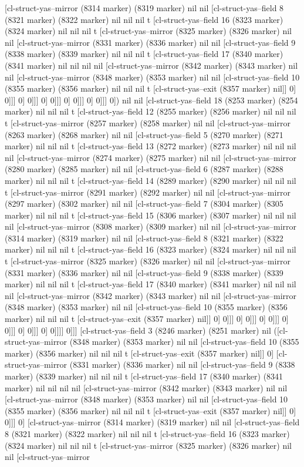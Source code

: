 {{[cl-struct-yas--mirror (8314 marker) (8319 marker) nil nil [cl-struct-yas--field 8 (8321 marker) (8322 marker) nil nil nil t [cl-struct-yas--field 16 (8323 marker) (8324 marker) nil nil nil t [cl-struct-yas--mirror (8325 marker) (8326 marker) nil nil [cl-struct-yas--mirror (8331 marker) (8336 marker) nil nil [cl-struct-yas--field 9 (8338 marker) (8339 marker) nil nil nil t [cl-struct-yas--field 17 (8340 marker) (8341 marker) nil nil nil nil [cl-struct-yas--mirror (8342 marker) (8343 marker) nil nil [cl-struct-yas--mirror (8348 marker) (8353 marker) nil nil [cl-struct-yas--field 10 (8355 marker) (8356 marker) nil nil nil t [cl-struct-yas--exit (8357 marker) nil]] 0] 0]]] 0] 0]]] 0] 0]]] 0] 0]]] 0] 0]]] 0]) nil nil [cl-struct-yas--field 18 (8253 marker) (8254 marker) nil nil nil t [cl-struct-yas--field 12 (8255 marker) (8256 marker) nil nil nil t [cl-struct-yas--mirror (8257 marker) (8258 marker) nil nil [cl-struct-yas--mirror (8263 marker) (8268 marker) nil nil [cl-struct-yas--field 5 (8270 marker) (8271 marker) nil nil nil t [cl-struct-yas--field 13 (8272 marker) (8273 marker) nil nil nil nil [cl-struct-yas--mirror (8274 marker) (8275 marker) nil nil [cl-struct-yas--mirror (8280 marker) (8285 marker) nil nil [cl-struct-yas--field 6 (8287 marker) (8288 marker) nil nil nil t [cl-struct-yas--field 14 (8289 marker) (8290 marker) nil nil nil t [cl-struct-yas--mirror (8291 marker) (8292 marker) nil nil [cl-struct-yas--mirror (8297 marker) (8302 marker) nil nil [cl-struct-yas--field 7 (8304 marker) (8305 marker) nil nil nil t [cl-struct-yas--field 15 (8306 marker) (8307 marker) nil nil nil nil [cl-struct-yas--mirror (8308 marker) (8309 marker) nil nil [cl-struct-yas--mirror (8314 marker) (8319 marker) nil nil [cl-struct-yas--field 8 (8321 marker) (8322 marker) nil nil nil t [cl-struct-yas--field 16 (8323 marker) (8324 marker) nil nil nil t [cl-struct-yas--mirror (8325 marker) (8326 marker) nil nil [cl-struct-yas--mirror (8331 marker) (8336 marker) nil nil [cl-struct-yas--field 9 (8338 marker) (8339 marker) nil nil nil t [cl-struct-yas--field 17 (8340 marker) (8341 marker) nil nil nil nil [cl-struct-yas--mirror (8342 marker) (8343 marker) nil nil [cl-struct-yas--mirror (8348 marker) (8353 marker) nil nil [cl-struct-yas--field 10 (8355 marker) (8356 marker) nil nil nil t [cl-struct-yas--exit (8357 marker) nil]] 0] 0]]] 0] 0]]] 0] 0]]] 0] 0]]] 0] 0]]] 0] 0]]]] 0]]] [cl-struct-yas--field 3 (8246 marker) (8251 marker) nil ([cl-struct-yas--mirror (8348 marker) (8353 marker) nil nil [cl-struct-yas--field 10 (8355 marker) (8356 marker) nil nil nil t [cl-struct-yas--exit (8357 marker) nil]] 0] [cl-struct-yas--mirror (8331 marker) (8336 marker) nil nil [cl-struct-yas--field 9 (8338 marker) (8339 marker) nil nil nil t [cl-struct-yas--field 17 (8340 marker) (8341 marker) nil nil nil nil [cl-struct-yas--mirror (8342 marker) (8343 marker) nil nil [cl-struct-yas--mirror (8348 marker) (8353 marker) nil nil [cl-struct-yas--field 10 (8355 marker) (8356 marker) nil nil nil t [cl-struct-yas--exit (8357 marker) nil]] 0] 0]]] 0] [cl-struct-yas--mirror (8314 marker) (8319 marker) nil nil [cl-struct-yas--field 8 (8321 marker) (8322 marker) nil nil nil t [cl-struct-yas--field 16 (8323 marker) (8324 marker) nil nil nil t [cl-struct-yas--mirror (8325 marker) (8326 marker) nil nil [cl-struct-yas--mirror }}
